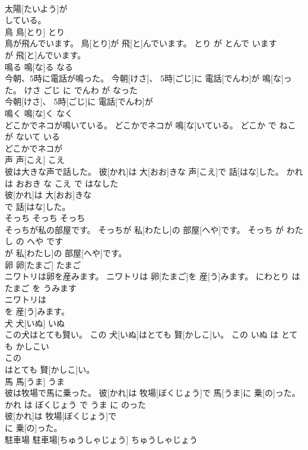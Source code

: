 \documentclass[8pt]{extreport}
\begin{document}
\begin{CJK}{UTF8}{min}
\\	太陽[たいよう]が
\\	している。			
\\	鳥	鳥[とり]	とり	
\\	鳥が飛んでいます。	鳥[とり]が 飛[と]んでいます。	とり が とんで います	
\\	が 飛[と]んでいます。			
\\	鳴る	鳴[な]る	なる	
\\	今朝、5時に電話が鳴った。	今朝[けさ]、 5時[ごじ]に 電話[でんわ]が 鳴[な]った。	けさ ごじ に でんわ が なった	
\\	今朝[けさ]、 5時[ごじ]に 電話[でんわ]が
\\	鳴く	鳴[な]く	なく	
\\	どこかでネコが鳴いている。	どこかでネコが 鳴[な]いている。	どこか で ねこ が ないて いる	
\\	どこかでネコが
\\	声	声[こえ]	こえ	
\\	彼は大きな声で話した。	彼[かれ]は 大[おお]きな 声[こえ]で 話[はな]した。	かれ は おおき な こえ で はなした	
\\	彼[かれ]は 大[おお]きな
\\	で 話[はな]した。			
\\	そっち	そっち	そっち	
\\	そっちが私の部屋です。	そっちが 私[わたし]の 部屋[へや]です。	そっち が わたし の へや です	
\\	が 私[わたし]の 部屋[へや]です。			
\\	卵	卵[たまご]	たまご	
\\	ニワトリは卵を産みます。	ニワトリは 卵[たまご]を 産[う]みます。	にわとり は たまご を うみます	
\\	ニワトリは
\\	を 産[う]みます。			
\\	犬	犬[いぬ]	いぬ	
\\	この犬はとても賢い。	この 犬[いぬ]はとても 賢[かしこ]い。	この いぬ は とても かしこい	
\\	この
\\	はとても 賢[かしこ]い。			
\\	馬	馬[うま]	うま	
\\	彼は牧場で馬に乗った。	彼[かれ]は 牧場[ぼくじょう]で 馬[うま]に 乗[の]った。	かれ は ぼくじょう で うま に のった	
\\	彼[かれ]は 牧場[ぼくじょう]で
\\	に 乗[の]った。			
\\	駐車場	駐車場[ちゅうしゃじょう]	ちゅうしゃじょう	

\end{CJK}
\end{document}
